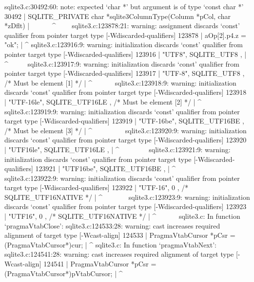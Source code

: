{{{{{{{{{{{{{{{{{sqlite3.c:30492:60: note: expected ‘char *’ but argument is of type ‘const char *’
30492 | SQLITE_PRIVATE char *sqlite3ColumnType(Column *pCol, char *zDflt){
      |                                                      ~~~~~~^~~~~
sqlite3.c:123878:21: warning: assignment discards ‘const’ qualifier from pointer target type [-Wdiscarded-qualifiers]
123878 |         aOp[2].p4.z = "ok";
       |                     ^
sqlite3.c:123916:9: warning: initialization discards ‘const’ qualifier from pointer target type [-Wdiscarded-qualifiers]
123916 |       { "UTF8",     SQLITE_UTF8        },
       |         ^~~~~~
sqlite3.c:123917:9: warning: initialization discards ‘const’ qualifier from pointer target type [-Wdiscarded-qualifiers]
123917 |       { "UTF-8",    SQLITE_UTF8        },  /* Must be element [1] */
       |         ^~~~~~~
sqlite3.c:123918:9: warning: initialization discards ‘const’ qualifier from pointer target type [-Wdiscarded-qualifiers]
123918 |       { "UTF-16le", SQLITE_UTF16LE     },  /* Must be element [2] */
       |         ^~~~~~~~~~
sqlite3.c:123919:9: warning: initialization discards ‘const’ qualifier from pointer target type [-Wdiscarded-qualifiers]
123919 |       { "UTF-16be", SQLITE_UTF16BE     },  /* Must be element [3] */
       |         ^~~~~~~~~~
sqlite3.c:123920:9: warning: initialization discards ‘const’ qualifier from pointer target type [-Wdiscarded-qualifiers]
123920 |       { "UTF16le",  SQLITE_UTF16LE     },
       |         ^~~~~~~~~
sqlite3.c:123921:9: warning: initialization discards ‘const’ qualifier from pointer target type [-Wdiscarded-qualifiers]
123921 |       { "UTF16be",  SQLITE_UTF16BE     },
       |         ^~~~~~~~~
sqlite3.c:123922:9: warning: initialization discards ‘const’ qualifier from pointer target type [-Wdiscarded-qualifiers]
123922 |       { "UTF-16",   0                  }, /* SQLITE_UTF16NATIVE */
       |         ^~~~~~~~
sqlite3.c:123923:9: warning: initialization discards ‘const’ qualifier from pointer target type [-Wdiscarded-qualifiers]
123923 |       { "UTF16",    0                  }, /* SQLITE_UTF16NATIVE */
       |         ^~~~~~~
sqlite3.c: In function ‘pragmaVtabClose’:
sqlite3.c:124533:28: warning: cast increases required alignment of target type [-Wcast-align]
124533 |   PragmaVtabCursor *pCsr = (PragmaVtabCursor*)cur;
       |                            ^
sqlite3.c: In function ‘pragmaVtabNext’:
sqlite3.c:124541:28: warning: cast increases required alignment of target type [-Wcast-align]
124541 |   PragmaVtabCursor *pCsr = (PragmaVtabCursor*)pVtabCursor;
       |                            ^
}}}}}}}}}}}}}}}}}}
